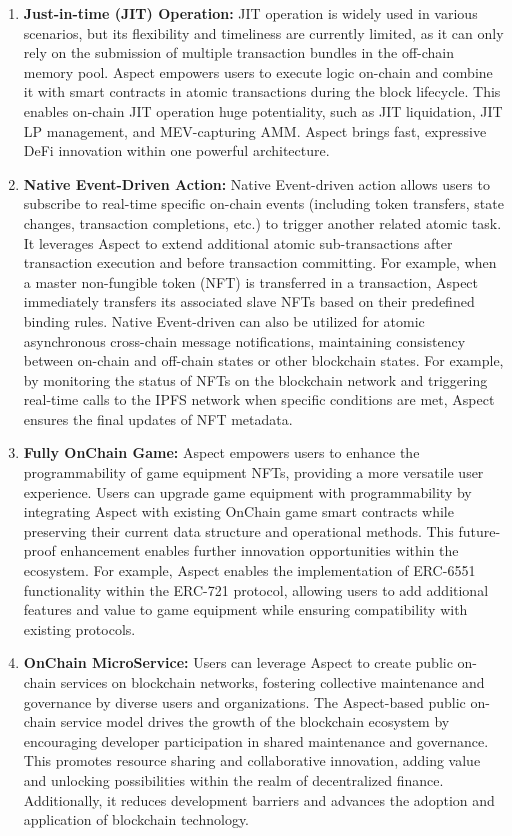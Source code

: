 \begin{enumerate}
  \item \textbf{Just-in-time (JIT) Operation:} JIT operation is widely used in various scenarios, but its flexibility and timeliness are currently limited, as it can only rely on the submission of multiple transaction bundles in the off-chain memory pool. Aspect empowers users to execute logic on-chain and combine it with smart contracts in atomic transactions during the block lifecycle. This enables on-chain JIT operation huge potentiality, such as JIT liquidation, JIT LP management, and MEV-capturing AMM. Aspect brings fast, expressive DeFi innovation within one powerful architecture.
  
  \item \textbf{Native Event-Driven Action:} Native Event-driven action allows users to subscribe to real-time specific on-chain events (including token transfers, state changes, transaction completions, etc.) to trigger another related atomic task. It leverages Aspect to extend additional atomic sub-transactions after transaction execution and before transaction committing. For example, when a master non-fungible token (NFT) is transferred in a transaction, Aspect immediately transfers its associated slave NFTs based on their predefined binding rules. Native Event-driven can also be utilized for atomic asynchronous cross-chain message notifications, maintaining consistency between on-chain and off-chain states or other blockchain states. For example, by monitoring the status of NFTs on the blockchain network and triggering real-time calls to the IPFS network when specific conditions are met, Aspect ensures the final updates of NFT metadata.
    
  \item \textbf{Fully OnChain Game:} Aspect empowers users to enhance the programmability of game equipment NFTs, providing a more versatile user experience. Users can upgrade game equipment with programmability by integrating Aspect with existing OnChain game smart contracts while preserving their current data structure and operational methods. This future-proof enhancement enables further innovation opportunities within the ecosystem. For example, Aspect enables the implementation of ERC-6551 functionality within the ERC-721 protocol, allowing users to add additional features and value to game equipment while ensuring compatibility with existing protocols.

  \item \textbf{OnChain MicroService:} Users can leverage Aspect to create public on-chain services on blockchain networks, fostering collective maintenance and governance by diverse users and organizations. The Aspect-based public on-chain service model drives the growth of the blockchain ecosystem by encouraging developer participation in shared maintenance and governance. This promotes resource sharing and collaborative innovation, adding value and unlocking possibilities within the realm of decentralized finance. Additionally, it reduces development barriers and advances the adoption and application of blockchain technology.
\end{enumerate}

